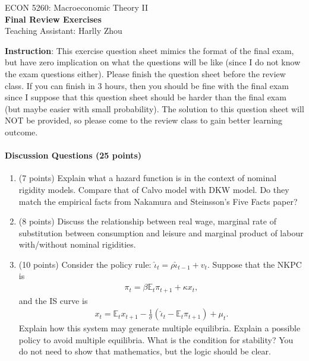 \documentclass[12pt]{article}
\begin{document}
\begin{center}
    ECON 5260: Macroeconomic Theory II\\
    {\large \textbf{Final Review Exercises}}\\
    Teaching Assistant: Harlly Zhou
\end{center}

\textbf{Instruction}: This exercise question sheet mimics the format of the final exam, but have zero implication on what the questions will be like (since I do not know the exam questions either). Please finish the question sheet before the review class. If you can finish in 3 hours, then you should be fine with the final exam since I suppose that this question sheet should be harder than the final exam (but maybe easier with small probability). The solution to this question sheet will NOT be provided, so please come to the review class to gain better learning outcome.

\paragraph{Discussion Questions (25 points)}
\begin{enumerate}[label=\arabic*.]
    \item (7 points) Explain what a hazard function is in the context of nominal rigidity models. Compare that of Calvo model with DKW model. Do they match the empirical facts from Nakamura and Steinsson's Five Facts paper?
    \item (8 points) Discuss the relationship between real wage, marginal rate of substitution between consumption and leisure and marginal product of labour with/without nominal rigidities.
    \item (10 points) Consider the policy rule: $\hat{\iota}_t = \rho \hat{\iota}_{t-1} + v_t$. Suppose that the NKPC is
    \begin{align*}
        \pi_t = \beta \mathbb{E}_t \pi_{t+1} + \kappa x_t,
    \end{align*}
    and the IS curve is
    \begin{align*}
        x_t = \mathbb{E}_t x_{t+1} - \frac{1}{\sigma} (\hat{\iota}_t - \mathbb{E}_t \pi_{t+1}) + \mu_t.
    \end{align*}
    Explain how this system may generate multiple equilibria. Explain a possible policy to avoid multiple equilibria. What is the condition for stability? You do not need to show that mathematics, but the logic should be clear.
\end{enumerate}
\end{document}
